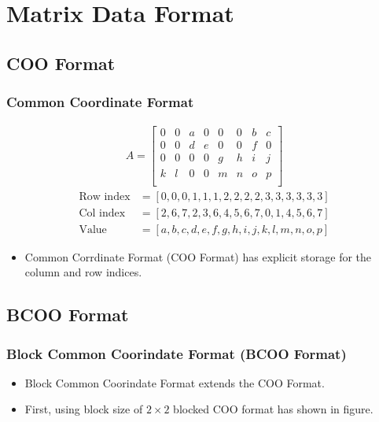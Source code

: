 \section{Matrix Data Format}

\subsection{COO Format}
\begin{frame}
    \frametitle{Common Coordinate Format}
	\begin{align*}
		A = \begin{bmatrix}
			0 & 0 & a & 0 & 0 & 0 & b & c \\
			0 & 0 & d & e & 0 & 0 & f & 0 \\
			0 & 0 & 0 & 0 & g & h & i & j \\
			k & l & 0 & 0 & m & n & o & p \\
		\end{bmatrix}
	\end{align*}
	\begin{align*}
		\text{Row index} &= [0, 0, 0, 1, 1, 1, 2, 2, 2, 2, 3, 3, 3, 3, 3, 3] \\
		\text{Col index} &= [2, 6, 7, 2, 3, 6, 4, 5, 6, 7, 0, 1, 4, 5, 6, 7] \\
		\text{Value}     &= [a, b, c, d, e, f, g, h, i, j, k, l, m, n, o, p]
	\end{align*}
    \begin{itemize} 
    	\item
    		Common Corrdinate Format (COO Format) has explicit storage for the
    		column and row indices.
    \end{itemize}	
\end{frame}

\subsection{BCOO Format}
\begin{frame}
	\frametitle{Block Common Coorindate Format (BCOO Format)}
	\begin{itemize}
		\item Block Common Coorindate Format extends the COO Format.
		\item First, using block size of $2 \times 2$ blocked COO format has 
			shown in figure.
	\end{itemize}
	
\end{frame}

